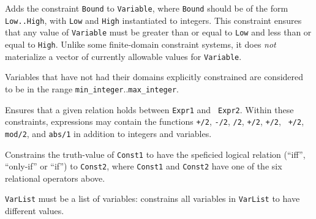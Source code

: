 \begin{description}

%
Adds the constraint {\tt Bound} to {\tt Variable}, where {\tt Bound}
should be of the form {\tt Low..High}, with {\tt Low} and {\tt High}
instantiated to integers.  This constraint ensures that any value of
{\tt Variable} must be greater than or equal to {\tt Low} and less
than or equal to {\tt High}.  Unlike some finite-domain constraint
systems, it does {\em not} materialize a vector of currently allowable
values for {\tt Variable}.

Variables that have not had their domains explicitly constrained are
considered to be in the range {\tt min\_integer}..{\tt max\_integer}.


%
Ensures that a given relation holds between {\tt Expr1} and {\tt
  Expr2}.  Within these constraints, expressions may contain the
functions {\tt +/2}, {\tt -/2}, {\tt */2}, {\tt +/2}, {\tt +/2}, {\tt
  +/2}, {\tt mod/2}, and {\tt abs/1} in addition to integers and
variables.

%
Constrains the truth-value of {\tt Const1} to have the speficied
logical relation (``iff'', ``only-if'' or ``if'') to {\tt Const2},
where {\tt Const1} and {\tt Const2} have one of the six relational
operators above.  

%
{\tt VarList} must be a list of variables: constrains all variables in
{\tt VarList} to have different values.


\end{description}
